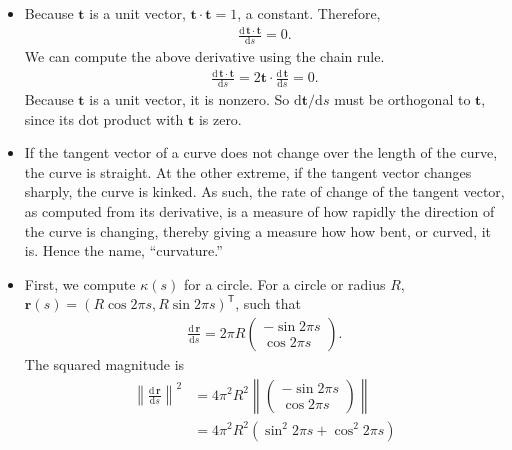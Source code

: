 \documentclass{integrated_core_problems}
\begin{document}
\begin{answerkey}
  \begin{solution}
    \begin{itemize}
      \item[a)]
      Because $\mathbf{t}$ is a unit vector, $\mathbf{t}\cdot \mathbf{t} = 1$, a constant. Therefore,
      \begin{align}
        \frac{\mathrm{d}\,\mathbf{t}\cdot\mathbf{t}}{\mathrm{d}s} = 0.
      \end{align}
      We can compute the above derivative using the chain rule.
      \begin{align}
        \frac{\mathrm{d}\,\mathbf{t}\cdot\mathbf{t}}{\mathrm{d}s} = 2\mathbf{t}\cdot\frac{\mathrm{d}\,\mathbf{t}}{\mathrm{d}s} = 0.
      \end{align}
      Because $\mathbf{t}$ is a unit vector, it is nonzero. So $\mathrm{d}\mathbf{t}/\mathrm{d}s$ must be orthogonal to $\mathbf{t}$, since its dot product with $\mathbf{t}$ is zero.
      \item[b)] If the tangent vector of a curve does not change over the length of the curve, the curve is straight. At the other extreme, if the tangent vector changes sharply, the curve is kinked. As such, the rate of change of the tangent vector, as computed from its derivative, is a measure of how rapidly the direction of the curve is changing, thereby giving a measure how how bent, or curved, it is. Hence the name, ``curvature.''
      \item[c)] First, we compute $\kappa(s)$ for a circle. For a circle or radius $R$, $\mathbf{r}(s) = (R\cos 2\pi s, R\sin 2\pi s)^\mathsf{T}$, such that
      \begin{align}
        \frac{\mathrm{d}\,\mathbf{r}}{\mathrm{d}s} = 2 \pi R \begin{pmatrix}
          -\sin 2\pi s \\ \cos 2\pi s
        \end{pmatrix}.
      \end{align}
      The squared magnitude is
      \begin{align}
        \left\lVert\frac{\mathrm{d}\,\mathbf{r}}{\mathrm{d}s}\right\rVert^2 &= 4 \pi^2 R^2 \left\lVert\begin{pmatrix}
          -\sin 2\pi s \\ \cos 2\pi s
        \end{pmatrix}\right\rVert \nonumber \\
        &= 4 \pi^2 R^2 \left(\sin^2 2\pi s + \cos^2 2\pi s\right) \nonumber \\

\end{align}
\end{itemize}
\end{solution}
\end{answerkey}
\end{document}
